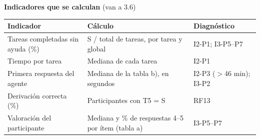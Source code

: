 \documentclass[11pt,a4paper]{article}
\begin{document}
\vspace{6pt}
\textbf{Indicadores que se calculan} (van a 3.6)

{\small
\begin{tabularx}{\linewidth}{|L{5.2cm}|X|L{2.6cm}|}
\hline
{}\textbf{Indicador} & \textbf{Cálculo} & \textbf{Diagnóstico} \\ \hline
Tareas completadas sin ayuda (\%) & S / total de tareas, por tarea y global & I2-P1; I3-P5--P7 \\ \hline
Tiempo por tarea & Mediana de cada tarea & I2-P1 \\ \hline
Primera respuesta del agente & Mediana de la tabla b), en segundos & I2-P3 ($>$46 min); I3-P2 \\ \hline
Derivación correcta (\%) & Participantes con T5 = S & RF13 \\ \hline
Valoración del participante & Mediana y \% de respuestas 4--5 por ítem (tabla a) & I3-P5--P7 \\ \hline
\end{tabularx}}
\end{document}
